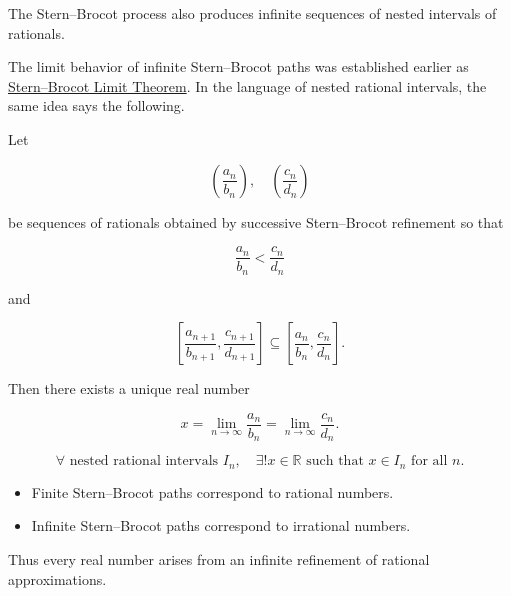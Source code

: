 \begin{exposition}
The Stern–Brocot process also produces infinite sequences of nested
intervals of rationals.
\end{exposition}

\begin{remark*}
The limit behavior of infinite Stern--Brocot paths was established earlier as
\hyperref[thm:stern-brocot-limit]{Stern--Brocot Limit Theorem}. In the language
of nested rational intervals, the same idea says the following.

Let

\[
\left(\frac{a_n}{b_n}\right),\quad
\left(\frac{c_n}{d_n}\right)
\]

be sequences of rationals obtained by successive Stern–Brocot
refinement so that

\[
\frac{a_n}{b_n}
<
\frac{c_n}{d_n}
\]

and

\[
\left[\frac{a_{n+1}}{b_{n+1}},\frac{c_{n+1}}{d_{n+1}}\right]
\subseteq
\left[\frac{a_n}{b_n},\frac{c_n}{d_n}\right].
\]

Then there exists a unique real number

\[
x
=
\lim_{n\to\infty}\frac{a_n}{b_n}
=
\lim_{n\to\infty}\frac{c_n}{d_n}.
\]

\end{remark*}

\begin{remark*}

\[
\forall
\text{ nested rational intervals } I_n,
\quad
\exists! x\in\mathbb{R}
\text{ such that }
x\in I_n
\text{ for all } n.
\]

\end{remark*}

\begin{remark*}[Interpretation]

\begin{itemize}
\item Finite Stern–Brocot paths correspond to rational numbers.
\item Infinite Stern–Brocot paths correspond to irrational numbers.
\end{itemize}

Thus every real number arises from an infinite refinement of
rational approximations.

\end{remark*}

\begin{exposition}
\bigskip
\end{exposition}

